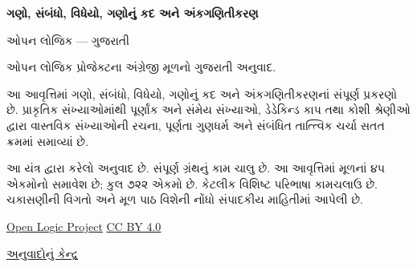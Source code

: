 
\usepackage[authoryear]{natbib}
\renewcommand{\refname}{સંદર્ભગ્રંથો}
\renewcommand{\partname}{ભાગ}
\newenvironment{intro}{}{}
\newcommand{\Id}[1]{\mathord{\mathrm{Id}_{#1}}}
\newcommand{\equivrep}[2]{[#1]_{#2}}
\newcommand{\equivclass}[2]{#1/_{\!{#2}}}
\newcommand{\Intequiv}{\mathrel{\sim_{\Int}}}
\newcommand{\Ratequiv}{\mathrel{\sim_{\Rat}}}
\newcommand{\Realequiv}{\mathrel{\sim_{\Real}}}
\newcommand{\funrestrictionto}[2]{#1\mathord{\restriction}_{#2}}
\newcommand{\funimage}[2]{#1[#2]}
\newcommand{\emptyseq}{\Lambda}
\newcommand{\liff}{\mathbin{\leftrightarrow}}
\newcommand{\dom}[1]{\mathrm{dom}(#1)}
\newcommand{\ran}[1]{\mathrm{ran}(#1)}
\newcommand{\comp}[2]{#2\circ #1}
\newcommand{\pto}{\mathrel{\ooalign{\hfil$\mapstochar\mkern5mu$\hfil\cr$\to$}}}
\newcommand{\fdefined}{\downarrow}
\newcommand{\fundefined}{\uparrow}
\newcommand{\sourcecorrection}[2]{%
  \par\smallskip\noindent
  \fbox{\begin{minipage}{0.94\linewidth}\small
    \textbf{સ્રોત-સુધારો #1.} #2
  \end{minipage}}%
  \par\smallskip}
\newlength{\olphotowidth}
\setlength{\olphotowidth}{.4\textwidth}

\renewcommand{\oliflabeldef}[3]{\ifcsname guavailable@#1\endcsname#2\else#3\fi}

\begin{titlepage}
{\Huge\bfseries ગણો, સંબંધો, વિધેયો, ગણોનું કદ અને અંકગણિતીકરણ\par}
\vspace{1em}
{\Large ઓપન લોજિક — ગુજરાતી\par}
\vspace{2em}
ઓપન લોજિક પ્રોજેક્ટના અંગ્રેજી મૂળનો ગુજરાતી અનુવાદ.\par
\vspace{1em}
આ આવૃત્તિમાં ગણો, સંબંધો, વિધેયો, ગણોનું કદ અને અંકગણિતીકરણનાં
સંપૂર્ણ પ્રકરણો છે. પ્રાકૃતિક સંખ્યાઓમાંથી પૂર્ણાંક અને સંમેય સંખ્યાઓ,
ડેડેકિન્ડ કાપ તથા કોશી શ્રેણીઓ દ્વારા વાસ્તવિક સંખ્યાઓની રચના,
પૂર્ણતા ગુણધર્મ અને સંબંધિત તાત્ત્વિક ચર્ચા સતત ક્રમમાં સમાવ્યાં છે.\par
\vfill
આ યંત્ર દ્વારા કરેલો અનુવાદ છે. સંપૂર્ણ ગ્રંથનું કામ ચાલુ છે.
આ આવૃત્તિમાં મૂળનાં ૪૫ એકમોનો સમાવેશ છે; કુલ ૭૨૨ એકમો છે.
કેટલીક વિશિષ્ટ પરિભાષા કામચલાઉ છે. ચકાસણીની વિગતો અને
મૂળ પાઠ વિશેની નોંધો સંપાદકીય માહિતીમાં આપેલી છે.\par
\vspace{1em}
\href{https://github.com/OpenLogicProject/OpenLogic}{Open Logic Project}
\quad \href{https://creativecommons.org/licenses/by/4.0/}{CC BY 4.0}\par
\href{https://github.com/KokunoYumeto/OpenLogic-translations}{અનુવાદોનું કેન્દ્ર}\par
\end{titlepage}
\tableofcontents
\clearpage

\clearpage
